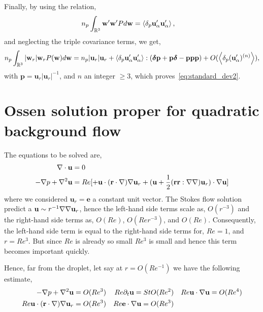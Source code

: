 Finally, by using the relation,
\begin{align*}
    n_p \int_{\mathbb{R}^3}\textbf{w}'\textbf{w}' P d\textbf{w} 
    &=\left<\delta_{p} \textbf{u}_\alpha'\textbf{u}_\alpha'\right>, 
\end{align*}
and neglecting the triple covariance terms, we get, 
\begin{equation}
    n_p  \int_{\mathbb{R}^3} 
    |\textbf{w}_r| \textbf{w}_r
    P(\textbf{w})
    d\textbf{w}
    =
    n_p  
    |\textbf{u}_r|\textbf{u}_r + 
    \left<\delta_{p} \textbf{u}_\alpha'\textbf{u}_\alpha'\right>:
    (\bm\delta \textbf{p} +\textbf{p} \bm\delta  - \textbf{ppp})
    +O(\left<\delta_{p} (\textbf{u}_\alpha')^{(n)}\right>),
\end{equation}
with $\textbf{p} = \textbf{u}_r|\textbf{u}_r|^{-1}$, and $n$ an integer $\ge 3$, which proves~\ref{eq:standard_dev2}. 

\section{Ossen solution proper for quadratic background flow}

The equations to be solved are, 
\begin{align}
    \mathbf{\nabla}\cdot \textbf{u} &= 0
    \\
    -\mathbf{\nabla} p + \mathbf{\nabla}^2 \textbf{u}
    &= 
    Re [
        + \textbf{u}\cdot (\textbf{r}\cdot \mathbf{\nabla})\mathbf{\nabla} \textbf{u}_r
        + (\textbf{u} + \frac{1}{2}(\textbf{rr}:\mathbf{\nabla}\mathbf{\nabla})\textbf{u}_r) \cdot \mathbf{\nabla} \textbf{u}
        ]
\end{align}
where we considered $\textbf{u}_r = \textbf{e}$ a constant unit vector. 
The Stokes flow solution predict a $\textbf{u}\sim r^{-1}\mathbf{\nabla}\mathbf{\nabla} \textbf{u}_r$, hence the left-hand side terms scale as, $O(r^{-3})$ and the right-hand side terms as, $O(Re)$, $O(Re r^{-3})$, and $O(Re)$. 
Consequently, the left-hand side term is equal to the right-hand side terms for, $Re = 1$, and $r = Re^3$. 
But since $Re$ is already so small $Re^3$ is small and hence this term becomes important quickly. 

Hence, far from the droplet, let say at $r = O(Re^{-1})$ we have the following estimate, 
\begin{align}
    -\mathbf{\nabla} p + \mathbf{\nabla}^2 \textbf{u} = O(Re^3) &&
    Re \partial_t \textbf{u} = St O(Re^2) && 
    Re \textbf{u}\cdot \mathbf{\nabla} \textbf{u} = O(Re^4) \\
    Re \textbf{u}\cdot (\textbf{r}\cdot \mathbf{\nabla})\mathbf{\nabla} \textbf{u}_r = O(Re^3) 
    &&
    Re \textbf{e}\cdot \mathbf{\nabla} \textbf{u} = O(Re^3) 
    &&
\end{align}



